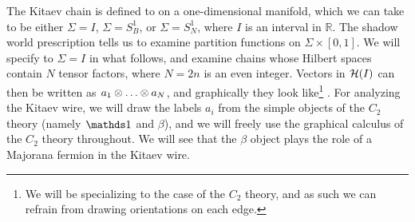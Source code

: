 The Kitaev chain is defined to on a one-dimensional manifold, which we can take to be 
either $\Sigma = I$, $\Sigma = S^1_B$, or $\Sigma = S^1_N$, where $I$ is an interval in $\mathbb{R}$. The shadow world prescription tells us to examine 
partition functions on $\Sigma \times [0,1]$. We will specify to $\Sigma = I$ in what follows, and examine 
chains whose Hilbert spaces contain $N$ tensor factors, where $N=2n$ is an even integer. 
Vectors in $\mathcal{H}(I)$ can then be written as $a_1\tp\dots\tp a_N$, and graphically 
they look like\footnote{We will be specializing to the case of the $C_2$ theory, and as such we can
refrain from drawing orientations on each edge.}
\be  \label{graphical_MPS_state}
.
\ee
For analyzing the Kitaev wire, we will draw the labels $a_i$ from the simple objects of the $C_2$ theory (namely $\unit$ and $\beta$),
and we will freely use 
the graphical calculus of the $C_2$ theory throughout.  
We will see that the $\beta$ object plays the role of a Majorana fermion in the Kitaev wire. 

